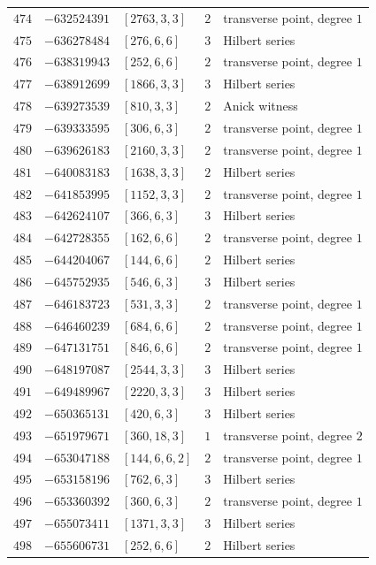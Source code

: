 \documentclass[11pt]{article}
\begin{document}
\begin{center}
\begin{longtable}{r r l c l}
$474$ & $-632524391$ & $[2763,3,3]$ & $2$ & transverse point, degree $1$\\
$475$ & $-636278484$ & $[276,6,6]$ & $3$ & Hilbert series\\
$476$ & $-638319943$ & $[252,6,6]$ & $2$ & transverse point, degree $1$\\
$477$ & $-638912699$ & $[1866,3,3]$ & $3$ & Hilbert series\\
$478$ & $-639273539$ & $[810,3,3]$ & $2$ & Anick witness\\
$479$ & $-639333595$ & $[306,6,3]$ & $2$ & transverse point, degree $1$\\
$480$ & $-639626183$ & $[2160,3,3]$ & $2$ & transverse point, degree $1$\\
$481$ & $-640083183$ & $[1638,3,3]$ & $2$ & Hilbert series\\
$482$ & $-641853995$ & $[1152,3,3]$ & $2$ & transverse point, degree $1$\\
$483$ & $-642624107$ & $[366,6,3]$ & $3$ & Hilbert series\\
$484$ & $-642728355$ & $[162,6,6]$ & $2$ & transverse point, degree $1$\\
$485$ & $-644204067$ & $[144,6,6]$ & $2$ & Hilbert series\\
$486$ & $-645752935$ & $[546,6,3]$ & $3$ & Hilbert series\\
$487$ & $-646183723$ & $[531,3,3]$ & $2$ & transverse point, degree $1$\\
$488$ & $-646460239$ & $[684,6,6]$ & $2$ & transverse point, degree $1$\\
$489$ & $-647131751$ & $[846,6,6]$ & $2$ & transverse point, degree $1$\\
$490$ & $-648197087$ & $[2544,3,3]$ & $3$ & Hilbert series\\
$491$ & $-649489967$ & $[2220,3,3]$ & $3$ & Hilbert series\\
$492$ & $-650365131$ & $[420,6,3]$ & $3$ & Hilbert series\\
$493$ & $-651979671$ & $[360,18,3]$ & $1$ & transverse point, degree $2$\\
$494$ & $-653047188$ & $[144,6,6,2]$ & $2$ & transverse point, degree $1$\\
$495$ & $-653158196$ & $[762,6,3]$ & $3$ & Hilbert series\\
$496$ & $-653360392$ & $[360,6,3]$ & $2$ & transverse point, degree $1$\\
$497$ & $-655073411$ & $[1371,3,3]$ & $3$ & Hilbert series\\
$498$ & $-655606731$ & $[252,6,6]$ & $2$ & Hilbert series\\

\end{longtable}
\end{center}
\end{document}
